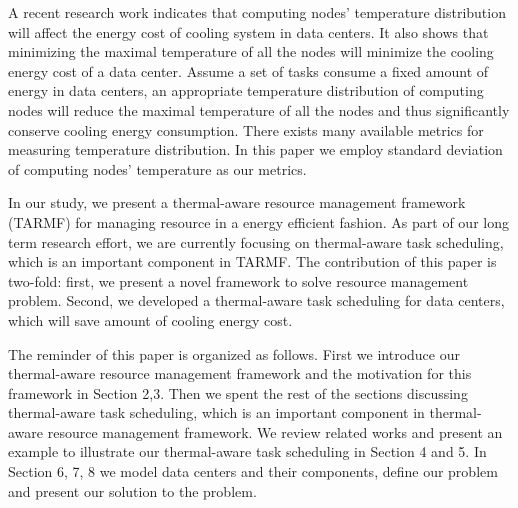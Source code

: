 A recent research work \cite{DBLP:conf/cluster/TangGV07} indicates that computing nodes' temperature distribution will affect the energy cost of cooling system in data centers. It also shows that minimizing the maximal temperature of all the nodes will minimize the cooling energy cost of a data center. Assume a set of tasks consume a fixed amount of energy in data centers, an appropriate temperature distribution of computing nodes will reduce the maximal temperature of all the nodes and thus significantly conserve cooling energy consumption. There exists many available metrics for measuring temperature distribution. In this paper we employ standard deviation of computing nodes' temperature as our metrics.  

\begin{comment}
In this paper we use standard deviation \cite{www-sd} to describe computing nodes' thermal distribution. Computing nodes' temperature standard deviation is the measure of how the computing nodes' temperature is close to their average value. A low standard deviation indicates that every computing node' temperature value tends to very close to the average value. A high standard deviation indicated that the temperature values in the computing nodes are distributed in a large range. Therefore, assume the same energy in data centers is needed to execute the same set of tasks, the goal of the efficient thermal management is to balance the thermal distribution on each node and make the computing nodes' temperature standard deviation as low as possible so that         
\end{comment}

In our study, we present a thermal-aware resource management framework (TARMF) for managing resource in a energy efficient fashion. As part of our long term research effort, we are currently focusing on thermal-aware task scheduling, which is an important component in TARMF. The contribution of this paper is two-fold: first, we present a novel framework to solve resource management problem. Second, we developed a thermal-aware task scheduling for data centers, which will save amount of cooling energy cost.

The reminder of this paper is organized as follows. First we introduce our thermal-aware resource management framework and the motivation for this framework in Section 2,3. Then we spent the rest of the sections discussing  thermal-aware task scheduling, which is an important component in thermal-aware resource management framework. We review related works and present an example to illustrate our thermal-aware task scheduling in Section 4 and 5. In Section 6, 7, 8 we model data centers and their components, define our problem and present our solution to the problem.

